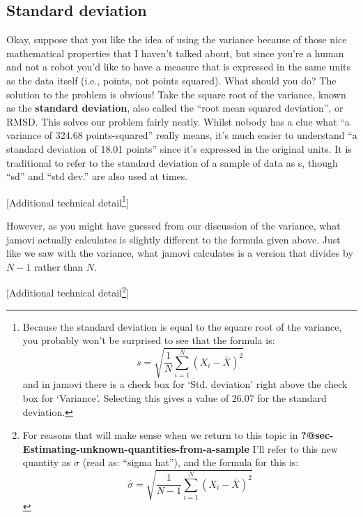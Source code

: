 \documentclass[
  a4paper,
]{book}
\begin{document}
\hypertarget{sec-Standard-deviation}{%
\subsection{Standard deviation}\label{sec-Standard-deviation}}

Okay, suppose that you like the idea of using the variance because of
those nice mathematical properties that I haven't talked about, but
since you're a human and not a robot you'd like to have a measure that
is expressed in the same units as the data itself (i.e., points, not
points squared). What should you do? The solution to the problem is
obvious! Take the square root of the variance, known as the
\textbf{standard deviation}, also called the ``root mean squared
deviation'', or RMSD. This solves our problem fairly neatly. Whilst
nobody has a clue what ``a variance of 324.68 points-squared'' really
means, it's much easier to understand ``a standard deviation of 18.01
points'' since it's expressed in the original units. It is traditional
to refer to the standard deviation of a sample of data as s, though
``sd'' and ``std dev.'' are also used at times.

{[}Additional technical detail\footnote{Because the standard deviation
  is equal to the square root of the variance, you probably won't be
  surprised to see that the formula is:
  \[s=\sqrt{\frac{1}{N} \sum_{i=1}^{N} ( X_i - \bar{X} )^2 }\] and in
  jamovi there is a check box for `Std. deviation' right above the check
  box for `Variance'. Selecting this gives a value of \(26.07\) for the
  standard deviation.}{]}

However, as you might have guessed from our discussion of the variance,
what jamovi actually calculates is slightly different to the formula
given above. Just like we saw with the variance, what jamovi calculates
is a version that divides by \(N - 1\) rather than \(N\).

{[}Additional technical detail\footnote{For reasons that will make sense
  when we return to this topic in
  \textbf{?@sec-Estimating-unknown-quantities-from-a-sample} I'll refer
  to this new quantity as \(\hat{\sigma}\) (read as: ``sigma hat''), and
  the formula for this is:
  \[\hat{\sigma}=\sqrt{\frac{1}{N-1} \sum_{i=1}^{N} ( X_i - \bar{X} )^2}\]}{]}
\end{document}
